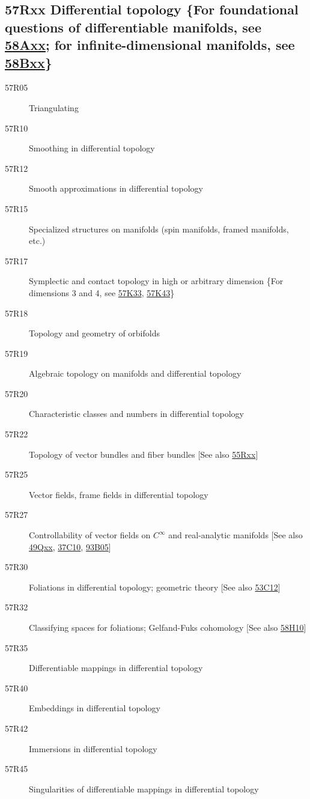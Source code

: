 \documentclass[letterpaper]{article}
\begin{document}
\subsection*{57Rxx  Differential topology \{For foundational questions of differentiable manifolds, see \hyperref[58Axx]{58Axx}; for infinite-dimensional manifolds, see \hyperref[58Bxx]{58Bxx}\} }\label{57Rxx}
\begin{description}  
\item [57R05]\label{57R05} Triangulating 
\item [57R10]\label{57R10} Smoothing in differential topology
\item [57R12]\label{57R12} Smooth approximations in differential topology
\item [57R15]\label{57R15} Specialized structures on manifolds (spin manifolds, framed manifolds, etc.)
\item [57R17]\label{57R17} Symplectic and contact topology in high or arbitrary dimension \{For dimensions 3 and 4, see \hyperref[57K33]{57K33}, \hyperref[57K43]{57K43}\}
\item [57R18]\label{57R18} Topology and geometry of orbifolds
\item [57R19]\label{57R19} Algebraic topology on manifolds and differential topology
\item [57R20]\label{57R20} Characteristic classes and numbers in differential topology
\item [57R22]\label{57R22} Topology of vector bundles and fiber bundles [See also \hyperref[55Rxx]{55Rxx}]
\item [57R25]\label{57R25} Vector fields, frame fields in differential topology
\item [57R27]\label{57R27} Controllability of vector fields on $C^\infty$ and real-analytic manifolds [See also \hyperref[49Qxx]{49Qxx}, \hyperref[37C10]{37C10}, \hyperref[93B05]{93B05}]
\item [57R30]\label{57R30} Foliations in differential topology; geometric theory [See also \hyperref[53C12]{53C12}]
\item [57R32]\label{57R32} Classifying spaces for foliations; Gelfand-Fuks cohomology [See also \hyperref[58H10]{58H10}]
\item [57R35]\label{57R35} Differentiable mappings in differential topology
\item [57R40]\label{57R40} Embeddings in differential topology
\item [57R42]\label{57R42} Immersions in differential topology
\item [57R45]\label{57R45} Singularities of differentiable mappings in differential topology

\end{description}
\end{document}
